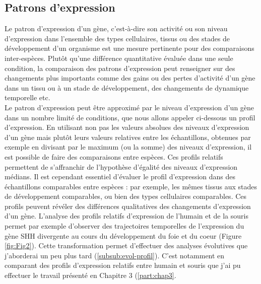 \subsection{Patrons d’expression}
\label{subsec:Patron-expression}

Le patron d’expression d’un gène, c’est-à-dire son activité ou son niveau d’expression dans l’ensemble des types cellulaires, tissus ou des stades de développement d’un organisme est une mesure pertinente pour des comparaisons inter-espèces. Plutôt qu’une différence quantitative évaluée dans une seule condition, la comparaison des patrons d’expression peut renseigner sur des changements plus importants comme des gains ou des pertes d’activité d’un gène dans un tissu ou à un stade de développement, des changements de dynamique temporelle etc.  \\

Le patron d’expression peut être approximé par le niveau d’expression d’un gène dans un nombre limité de \glspl{condition}, que nous allons appeler ci-dessous un profil d’expression. En utilisant non pas les valeurs absolues des niveaux d’expression d’un gène mais plutôt leurs valeurs relatives entre les échantillons, obtenues par exemple en divisant par le maximum (ou la somme) des niveaux d'expression, il est possible de faire des comparaisons entre espèces. Ces profils relatifs permettent de s’affranchir de l’hypothèse d’égalité des niveaux d’expression médians. Il est cependant essentiel d’évaluer le profil d’expression dans des échantillons comparables entre espèces : par exemple, les mêmes tissus aux stades de développement comparables, ou bien des types cellulaires comparables. Ces profils peuvent révéler des différences qualitatives des changements d’expression d’un gène. L’analyse des profils relatifs d'expression de l’humain et de la souris permet par exemple d’observer des trajectoires temporelles de l'expression du gène \acrshort{SHH} divergente au cours du développement du foie et du coeur (Figure \ref{fig:Fig2}). Cette transformation permet d’effectuer des analyses évolutives que j’aborderai un peu plus tard (\ref{subsub:evol-profil}). C’est notamment en comparant des profils d’expression relatifs entre humain et souris que j’ai pu effectuer le travail présenté en Chapitre 3 (\ref{part:chap3}. \\

